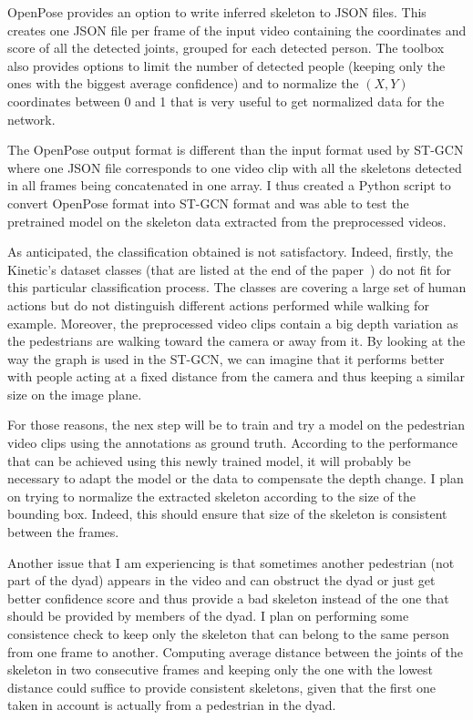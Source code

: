 \documentclass[12pt,a4paper,twoside]{article}
\begin{document}
OpenPose provides an option to write inferred skeleton to JSON files. This creates one JSON file per frame of the input video containing the coordinates and score of all the detected joints, grouped for each detected person. The toolbox also provides options to limit the number of detected people (keeping only the ones with the biggest average confidence) and to normalize the $(X,Y)$ coordinates between 0 and 1 that is very useful to get normalized data for the network.

The OpenPose output format is different than the input format used by ST-GCN where one JSON file corresponds to one video clip with all the skeletons detected in all frames being concatenated in one array. I thus created a Python script to convert OpenPose format into ST-GCN format and was able to test the pretrained model on the skeleton data extracted from the preprocessed videos.

As anticipated, the classification obtained is not satisfactory. Indeed, firstly, the Kinetic's dataset classes (that are listed at the end of the paper~\cite{Kay2017}) do not fit for this particular classification process. The classes are covering a large set of human actions but do not distinguish different actions performed while walking for example. Moreover, the preprocessed video clips contain a big depth variation as the pedestrians are walking toward the camera or away from it. By looking at the way the graph is used in the ST-GCN, we can imagine that it performs better with people acting at a fixed distance from the camera and thus keeping a similar size on the image plane. 

For those reasons, the nex step will be to train and try a model on the pedestrian video clips using the annotations as ground truth. According to the performance that can be achieved using this newly trained model, it will probably be necessary to adapt the model or the data to compensate the depth change. I plan on trying to normalize the extracted skeleton according to the size of the bounding box. Indeed, this should ensure that size of the skeleton is consistent between the frames.

Another issue that I am experiencing is that sometimes another pedestrian (not part of the dyad) appears in the video and can obstruct the dyad or just get better confidence score and thus provide a bad skeleton instead of the one that should be provided by members of the dyad. I plan on performing some consistence check to keep only the skeleton that can belong to the same person from one frame to another. Computing average distance between the joints of the skeleton in two consecutive frames and keeping only the one with the lowest distance could suffice to provide consistent skeletons, given that the first one taken in account is actually from a pedestrian in the dyad. 
\end{document}
